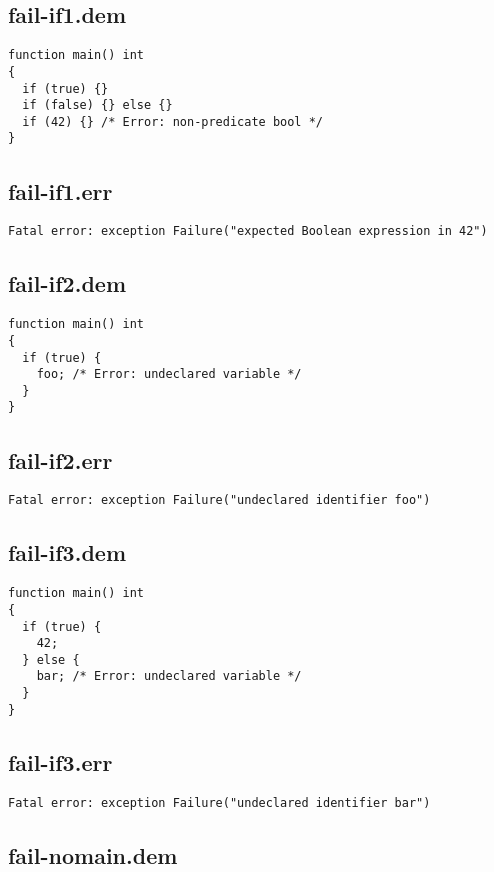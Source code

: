 \subsection{fail-if1.dem}
\begin{lstlisting}
function main() int
{
  if (true) {}
  if (false) {} else {}
  if (42) {} /* Error: non-predicate bool */
}
\end{lstlisting}
\subsection{fail-if1.err}
\begin{lstlisting}
Fatal error: exception Failure("expected Boolean expression in 42")
\end{lstlisting}
\subsection{fail-if2.dem}
\begin{lstlisting}
function main() int
{
  if (true) {
    foo; /* Error: undeclared variable */
  }
}
\end{lstlisting}
\subsection{fail-if2.err}
\begin{lstlisting}
Fatal error: exception Failure("undeclared identifier foo")
\end{lstlisting}
\subsection{fail-if3.dem}
\begin{lstlisting}
function main() int
{
  if (true) {
    42;
  } else {
    bar; /* Error: undeclared variable */
  }
}
\end{lstlisting}
\subsection{fail-if3.err}
\begin{lstlisting}
Fatal error: exception Failure("undeclared identifier bar")
\end{lstlisting}
\subsection{fail-nomain.dem}
\begin{lstlisting}
\end{lstlisting}
